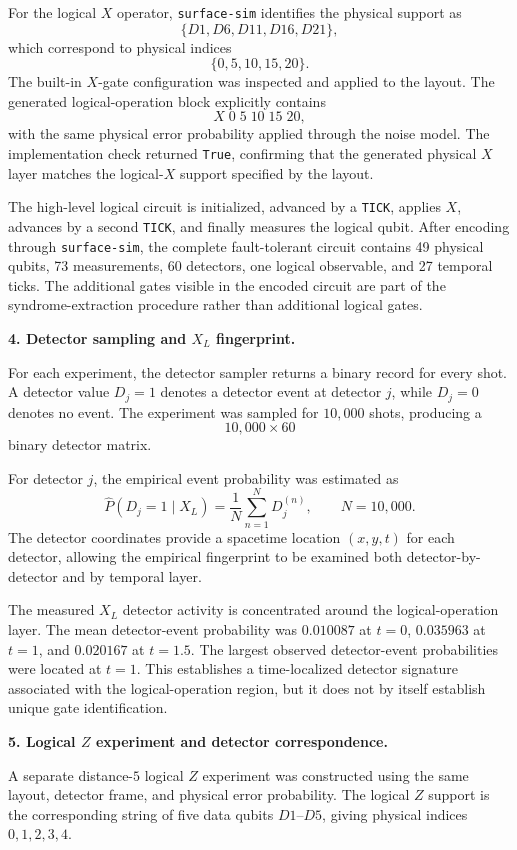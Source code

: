 \documentclass[10pt,a4paper]{article}
\begin{document}
For the logical \(X\) operator, \texttt{surface-sim} identifies the physical
support as
\[
\{D1,D6,D11,D16,D21\},
\]
which correspond to physical indices
\[
\{0,5,10,15,20\}.
\]
The built-in \(X\)-gate configuration was inspected and applied to the layout.
The generated logical-operation block explicitly contains
\[
X\;0\;5\;10\;15\;20,
\]
with the same physical error probability applied through the noise model. The
implementation check returned \texttt{True}, confirming that the generated
physical \(X\) layer matches the logical-\(X\) support specified by the layout.

The high-level logical circuit is initialized, advanced by a \texttt{TICK}, applies
\(X\), advances by a second \texttt{TICK}, and finally measures the logical qubit.
After encoding through \texttt{surface-sim}, the complete fault-tolerant circuit
contains 49 physical qubits, 73 measurements, 60 detectors, one logical observable,
and 27 temporal ticks. The additional gates visible in the encoded circuit are
part of the syndrome-extraction procedure rather than additional logical gates.

\textbf{4. Detector sampling and \(X_L\) fingerprint.}

For each experiment, the detector sampler returns a binary record for every shot.
A detector value \(D_j=1\) denotes a detector event at detector \(j\), while
\(D_j=0\) denotes no event. The experiment was sampled for
\(10{,}000\) shots, producing a
\[
10{,}000\times 60
\]
binary detector matrix.

For detector \(j\), the empirical event probability was estimated as
\[
\widehat{P}(D_j=1\mid X_L)
=
\frac{1}{N}\sum_{n=1}^{N}D_j^{(n)},
\qquad N=10{,}000.
\]
The detector coordinates provide a spacetime location \((x,y,t)\) for each
detector, allowing the empirical fingerprint to be examined both detector-by-
detector and by temporal layer.

The measured \(X_L\) detector activity is concentrated around the logical-operation
layer. The mean detector-event probability was \(0.010087\) at \(t=0\),
\(0.035963\) at \(t=1\), and \(0.020167\) at \(t=1.5\). The largest observed
detector-event probabilities were located at \(t=1\). This establishes a
time-localized detector signature associated with the logical-operation region,
but it does not by itself establish unique gate identification.

\textbf{5. Logical \(Z\) experiment and detector correspondence.}

A separate distance-\(5\) logical \(Z\) experiment was constructed using the same
layout, detector frame, and physical error probability. The logical \(Z\) support
is the corresponding string of five data qubits \(D1\)--\(D5\), giving physical
indices \(0,1,2,3,4\).
\end{document}
